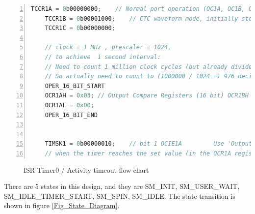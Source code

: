 \documentclass[a4paper,13pt,openany,sffamily]{memoir}
\begin{document}
\begin{lstlisting}[numbers=left, breaklines=true, caption={Timer 1 initialization },label={lst_timer1},language=C]
	TCCR1A = 0b00000000;    // Normal port operation (OC1A, OC1B, OC1C), Clear Timer on 'Compare Match' (CTC) waveform mode)
	TCCR1B = 0b00001000;    // CTC waveform mode, initially stopped (no clock)
	TCCR1C = 0b00000000;

	// clock = 1 MHz , prescaler = 1024,
    // to achieve  1 second interval:
	// Need to count 1 million clock cycles (but already divided by 1024)
	// So actually need to count to (1000000 / 1024 =) 976 decimal, = 3D0 Hex
	OPER_16_BIT_START
	OCR1AH = 0x03; // Output Compare Registers (16 bit) OCR1BH and OCR1BL
	OCR1AL = 0xD0;
	OPER_16_BIT_END

	
	TIMSK1 = 0b00000010;    // bit 1 OCIE1A         Use 'Output Compare A Match' Interrupt, i.e. generate an interrupt
	// when the timer reaches the set value (in the OCR1A register)
\end{lstlisting}
\begin{figure}[h]
\caption{ISR Timer0 / Activity timeout flow chart }
\label{Fig_ISR_Timer0}
\end{figure}

\clearpage
\newpage
There are 5 states in this design, and they are SM\_INIT, SM\_USER\_WAIT, SM\_IDLE\_TIMER\_START, SM\_SPIN, SM\_IDLE. The state transition is shown in figure \ref{Fig_State_Diagram}. 
\end{document}
